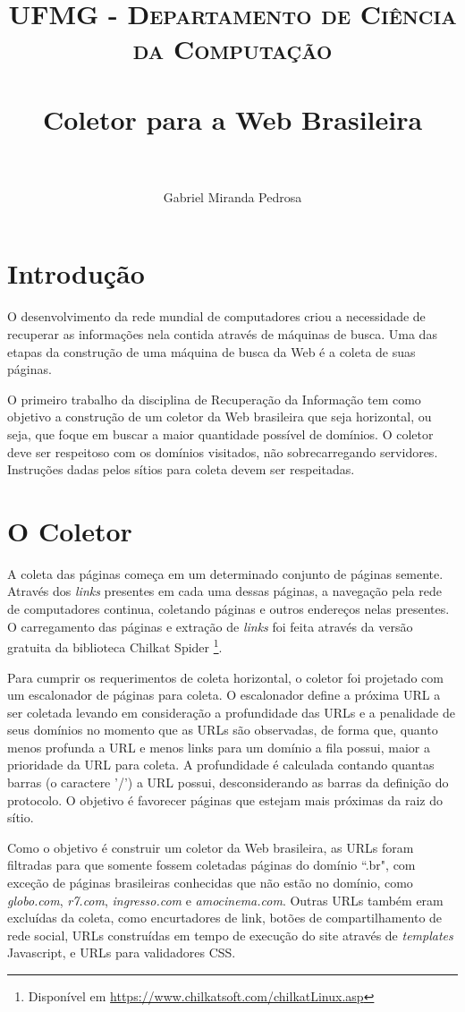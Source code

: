 \documentclass[paper=a4, fontsize=11pt]{scrartcl}
\title{
		\usefont{OT1}{bch}{b}{n}
		\normalfont \normalsize \textsc{UFMG - Departamento de Ciência da Computação} \\ [25pt]
		\horrule{0.5pt} \\[0.4cm]
		\huge Coletor para a Web Brasileira \\
		\horrule{2pt} \\[0.5cm]
}
\author{
		\normalfont 								\normalsize
        Gabriel Miranda Pedrosa\\[-3pt]		\normalsize
}
\numberwithin{equation}{section}		%
\numberwithin{figure}{section}			%
\numberwithin{table}{section}				%
\begin{document}
\maketitle
\section{Introdução}
O desenvolvimento da rede mundial de computadores criou a necessidade de recuperar as informações nela contida através de máquinas de busca. Uma das etapas da construção de uma máquina de busca da Web é a coleta de suas páginas.

O primeiro trabalho da disciplina de Recuperação da Informação tem como objetivo a construção de um coletor da Web brasileira que seja horizontal, ou seja, que foque em buscar a maior quantidade possível de domínios. O coletor deve ser respeitoso com os domínios visitados, não sobrecarregando servidores. Instruções dadas pelos sítios para coleta devem ser respeitadas.

\section{O Coletor}
A coleta das páginas começa em um determinado conjunto de páginas semente. Através dos \textit{links} presentes em cada uma dessas páginas, a navegação pela rede de computadores continua, coletando páginas e outros endereços nelas presentes. O carregamento das páginas e extração de \textit{links} foi feita através da versão gratuita da biblioteca Chilkat Spider \footnote{Disponível em \url{https://www.chilkatsoft.com/chilkatLinux.asp}}.

Para cumprir os requerimentos de coleta horizontal, o coletor foi projetado com um escalonador de páginas para coleta. O escalonador define a próxima URL a ser coletada levando em consideração a profundidade das URLs e a penalidade de seus domínios no momento que as URLs são observadas, de forma que, quanto menos profunda a URL e menos links para um domínio a fila possui, maior a prioridade da URL para coleta. A profundidade é calculada contando quantas barras (o caractere '/') a URL possui, desconsiderando as barras da definição do protocolo. O objetivo é favorecer páginas que estejam mais próximas da raiz do sítio.

Como o objetivo é construir um coletor da Web brasileira, as URLs foram filtradas para que somente fossem coletadas páginas do domínio ``.br", com exceção de páginas brasileiras conhecidas que não estão no domínio, como \textit{globo.com}, \textit{r7.com}, \textit{ingresso.com} e \textit{amocinema.com}. Outras URLs também eram excluídas da coleta, como encurtadores de link, botões de compartilhamento de rede social, URLs construídas em tempo de execução do site através de \textit{templates} Javascript, e URLs para validadores CSS.
\end{document}
